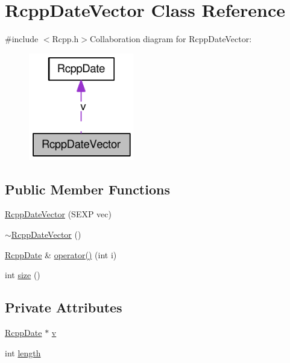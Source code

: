 \hypertarget{classRcppDateVector}{
\section{RcppDateVector Class Reference}
\label{classRcppDateVector}
}


{\ttfamily \#include $<$Rcpp.h$>$}Collaboration diagram for RcppDateVector:\nopagebreak
\begin{figure}[H]
\begin{center}
\leavevmode
\includegraphics[width=130pt]{classRcppDateVector__coll__graph}
\end{center}
\end{figure}
\subsection*{Public Member Functions}
\begin{DoxyCompactItemize}
\item 
\hyperlink{classRcppDateVector_a65de4c0807f5c4b33429c8ebb5224831}{RcppDateVector} (SEXP vec)
\item 
\hyperlink{classRcppDateVector_aad0851f7555a09615ccb17bcb20fc7f1}{$\sim$RcppDateVector} ()
\item 
\hyperlink{classRcppDate}{RcppDate} \& \hyperlink{classRcppDateVector_a7a6d9ceb233ed06f037013bdf4088a23}{operator()} (int i)
\item 
int \hyperlink{classRcppDateVector_a03db4282da968eb4e0ae2a38375e0d37}{size} ()
\end{DoxyCompactItemize}
\subsection*{Private Attributes}
\begin{DoxyCompactItemize}
\item 
\hyperlink{classRcppDate}{RcppDate} $\ast$ \hyperlink{classRcppDateVector_afaa34ebaf3d8bac309e81895c376f545}{v}
\item 
int \hyperlink{classRcppDateVector_aa36764f68111a84b737b78600ff06433}{length}
\end{DoxyCompactItemize}


